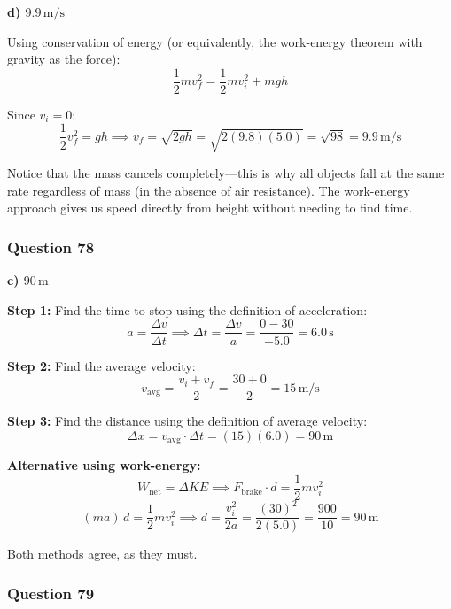 \documentclass[12pt,letterpaper]{article}
\begin{document}
\begin{answerbox}
\textbf{d) $9.9\,\text{m/s}$}
\end{answerbox}

\begin{explanationbox}
Using conservation of energy (or equivalently, the work-energy theorem with gravity as the force):
\[
\frac{1}{2}mv_f^2 = \frac{1}{2}mv_i^2 + mgh
\]

Since $v_i = 0$:
\[
\frac{1}{2}v_f^2 = gh \implies v_f = \sqrt{2gh} = \sqrt{2(9.8)(5.0)} = \sqrt{98} = 9.9\,\text{m/s}
\]

Notice that the mass cancels completely---this is why all objects fall at the same rate regardless of mass (in the absence of air resistance). The work-energy approach gives us speed directly from height without needing to find time.
\end{explanationbox}

\subsubsection*{Question 78}

\begin{answerbox}
\textbf{c) $90\,\text{m}$}
\end{answerbox}

\begin{explanationbox}
\textbf{Step 1:} Find the time to stop using the definition of acceleration:
\[
a = \frac{\Delta v}{\Delta t} \implies \Delta t = \frac{\Delta v}{a} = \frac{0 - 30}{-5.0} = 6.0\,\text{s}
\]

\textbf{Step 2:} Find the average velocity:
\[
v_{\text{avg}} = \frac{v_i + v_f}{2} = \frac{30 + 0}{2} = 15\,\text{m/s}
\]

\textbf{Step 3:} Find the distance using the definition of average velocity:
\[
\Delta x = v_{\text{avg}} \cdot \Delta t = (15)(6.0) = 90\,\text{m}
\]

\textbf{Alternative using work-energy:}
\[
W_{\text{net}} = \Delta KE \implies F_{\text{brake}} \cdot d = \frac{1}{2}mv_i^2
\]
\[
(ma)\,d = \frac{1}{2}mv_i^2 \implies d = \frac{v_i^2}{2a} = \frac{(30)^2}{2(5.0)} = \frac{900}{10} = 90\,\text{m}
\]

Both methods agree, as they must.
\end{explanationbox}

\subsubsection*{Question 79}
\end{document}
